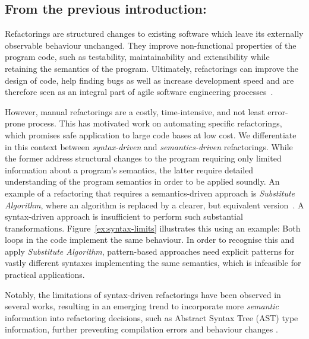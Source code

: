 \documentclass[runningheads,a4paper]{llncs}
\begin{document}

\subsection{From the previous introduction:}
Refactorings are structured changes to existing software which leave its
externally observable behaviour unchanged.  They improve non-functional
properties of the program code, such as testability, maintainability and
extensibility while retaining the semantics of the program.  Ultimately,
refactorings can improve the design of code, help finding bugs as well
as increase development speed and are therefore seen as an integral part
of agile software engineering processes~\cite{DBLP:conf/xpu/Kerievsky04b,
Fowler1999}.

However, manual refactorings are a costly, time-intensive, and not least
error-prone process.  This has motivated work on automating specific
refactorings, which promises safe application to large code bases at low
cost.  We differentiate in this context between {\em syntax-driven} and {\em
semantics-driven} refactorings.  While the former address structural changes
to the program requiring only limited information about a program's
semantics, the latter require detailed understanding of the program
semantics in order to be applied soundly.  An example of a refactoring that
requires a semantics-driven approach is {\em Substitute Algorithm}, where an
algorithm is replaced by a clearer, but equivalent
version~\cite{Fowler1999}.
%
%
A syntax-driven approach is insufficient to perform such substantial
transformations.  Figure~\ref{ex:syntax-limits} illustrates this using an
example: Both loops in the code implement the same behaviour.  In order to
recognise this and apply {\em Substitute Algorithm}, pattern-based
approaches need explicit patterns for vastly different syntaxes implementing
the same semantics, which is infeasible for practical applications.


Notably, the limitations of syntax-driven refactorings have been observed
in several works, resulting in an emerging trend to incorporate more {\em semantic}
information into refactoring decisions, such as Abstract Syntax Tree (AST) 
type information,
further preventing compilation errors and behaviour changes
\cite{Steimann2011,Steimann2012Pilgrim,Steimann2011KollePilgrim}.
\end{document}
